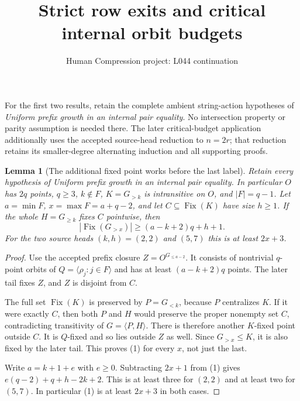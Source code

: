 \documentclass[11pt,a4paper]{article}
\title{Strict row exits and critical internal orbit budgets}
\author{Human Compression project: L044 continuation}
\date{}
\newtheorem{lemma}{Lemma}
\newcommand{\gen}[1]{\langle#1\rangle}
\begin{document}
\maketitle
For the first two results, retain the complete ambient string-action
hypotheses of \emph{Uniform prefix growth in an internal pair equality}.
No intersection property or parity assumption is needed there. The
later critical-budget application additionally uses the accepted
source-head reduction to $n=2r$; that reduction retains its smaller-degree
alternating induction and all supporting proofs.

\begin{lemma}[The additional fixed point works before the last label]
\label{extra}
Retain every hypothesis of \emph{Uniform prefix growth in an internal
pair equality}. In particular $O$ has $2q$ points, $q\ge3$,
$k\notin F$, $K=G_{>k}$ is intransitive on $O$, and
$|F|=q-1$. Let $a=\min F$, $x=\max F=a+q-2$, and let
$C\subseteq\operatorname{Fix}(K)$ have size $h\ge1$.
If the whole $H=G_{\ge k}$ fixes $C$ pointwise, then
\[
       |\operatorname{Fix}(G_{>x})|\ge(a-k+2)q+h+1.       \tag{1}
\]
For the two source heads $(k,h)=(2,2)$ and $(5,7)$ this is at
least $2x+3$.
\end{lemma}
\begin{proof}
Use the accepted prefix closure $Z=O^{G_{\le a-2}}$.
It consists of nontrivial $q$-point orbits of
$Q=\gen{\rho_j:j\in F}$ and has at least $(a-k+2)q$ points.
The later tail fixes $Z$, and $Z$ is disjoint from $C$.

The full set $\operatorname{Fix}(K)$ is preserved by
$P=G_{<k}$, because $P$ centralizes $K$. If it were exactly $C$,
then both $P$ and $H$ would preserve the proper nonempty set $C$,
contradicting transitivity of $G=\gen{P,H}$. There is therefore
another $K$-fixed point outside $C$. It is $Q$-fixed and so lies
outside $Z$ as well. Since $G_{>x}\le K$, it is also fixed by
the later tail. This proves (1) for every $x$, not just the last.

Write $a=k+1+e$ with $e\ge0$. Subtracting $2x+1$ from (1)
gives $e(q-2)+q+h-2k+2$. This is at least three for $(2,2)$
and at least two for $(5,7)$. In particular (1) is at least
$2x+3$ in both cases.
\end{proof}
\end{document}
